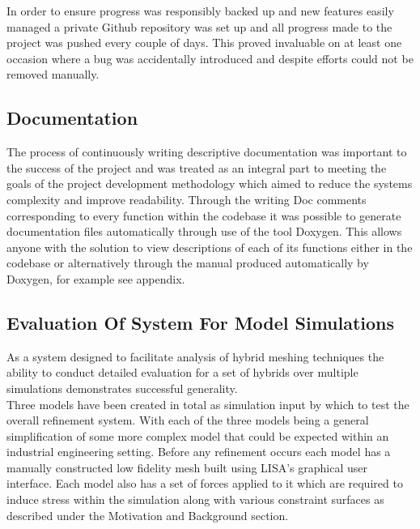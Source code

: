 \noindent
In order to ensure progress was responsibly backed up and new features easily managed a private Github repository was set up and all progress made to the project was pushed every couple of days. This proved invaluable on at least one occasion where a bug was accidentally introduced and despite efforts could not be removed manually. 


\subsection{Documentation}
The process of continuously writing descriptive documentation was important to the success of the project and was treated as an integral part to meeting the goals of the project development methodology which aimed to reduce the systems complexity and improve readability. Through the writing Doc comments corresponding to every function within the codebase it was possible to generate documentation files automatically through use of the tool Doxygen. This allows anyone with the solution to view descriptions of each of its functions either in the codebase or alternatively through the manual produced automatically by Doxygen, for example see appendix. \\ 

 

\subsection{Evaluation Of System For Model Simulations}

As a system designed to facilitate analysis of hybrid meshing techniques the ability to conduct detailed evaluation for a set of hybrids over multiple simulations demonstrates successful generality. \\

\noindent
Three models have been created in total as simulation input by which to test the overall refinement system. With each of the three models being a general simplification of some more complex model that could be expected within an industrial engineering setting. Before any refinement occurs each model has a manually constructed low fidelity mesh built using LISA's graphical user interface. Each model also has a set of forces applied to it which are required to induce stress within the simulation along with various constraint surfaces as described under the Motivation and Background section. \\ 

